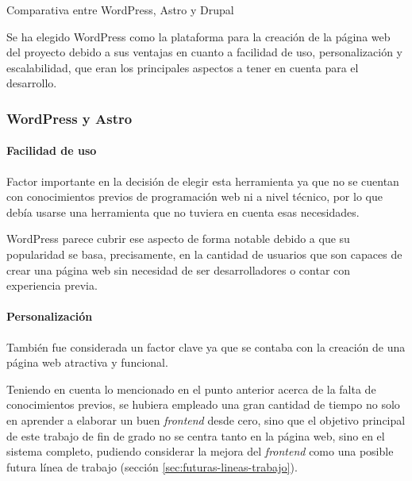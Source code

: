 \begin{table}[!htbp]
                \caption{Comparativa entre WordPress, Astro y Drupal}
                \label{tab:wordpress-vs-astro-vs-drupal}
            \end{table}

            Se ha elegido WordPress como la plataforma para la creación de la página web del proyecto debido a sus ventajas en cuanto a facilidad de uso, personalización y escalabilidad, que eran los principales aspectos a tener en cuenta para el desarrollo.
            
            \subsubsection{WordPress y Astro}

                \paragraph{Facilidad de uso}
                    
                    Factor importante en la decisión de elegir esta herramienta ya que no se cuentan con conocimientos previos de programación web ni a nivel técnico, por lo que debía usarse una herramienta que no tuviera en cuenta esas necesidades.
                    
                    WordPress parece cubrir ese aspecto de forma notable debido a que su popularidad se basa, precisamente, en la cantidad de usuarios que son capaces de crear una página web sin necesidad de ser desarrolladores o contar con experiencia previa.
                
                \paragraph{Personalización}
                
                    También fue considerada un factor clave ya que se contaba con la creación de una página web atractiva y funcional.
                    
                    Teniendo en cuenta lo mencionado en el punto anterior acerca de la falta de conocimientos previos, se hubiera empleado una gran cantidad de tiempo no solo en aprender a elaborar un buen \textit{frontend} desde cero, sino que el objetivo principal de este trabajo de fin de grado no se centra tanto en la página web, sino en el sistema completo, pudiendo considerar la mejora del \textit{frontend} como una posible futura línea de trabajo (sección \ref{sec:futuras-lineas-trabajo}).
                
